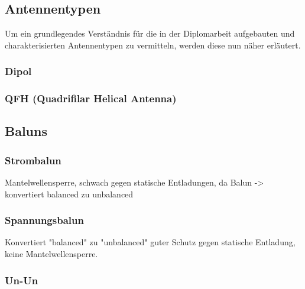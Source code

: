\subsection{Antennentypen}
Um ein grundlegendes Verständnis für die in der Diplomarbeit aufgebauten und charakterisierten Antennentypen zu vermitteln, werden diese nun näher erläutert.

\subsubsection{Dipol}

\subsubsection{QFH (Quadrifilar Helical Antenna)}

\subsection{Baluns}

\subsubsection{Strombalun}
Mantelwellensperre, schwach gegen statische Entladungen, da Balun -> konvertiert balanced zu unbalanced 

\subsubsection{Spannungsbalun}
Konvertiert "balanced" zu "unbalanced" guter Schutz gegen statische Entladung, keine Mantelwellensperre.

\subsubsection{Un-Un}